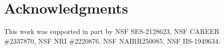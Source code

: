 
\section*{Acknowledgments}
This work was supported in part by NSF SES-2128623, NSF CAREER \#2337870, NSF NRI \#2220876, NSF NAIRR250085, NSF IIS-1949634.